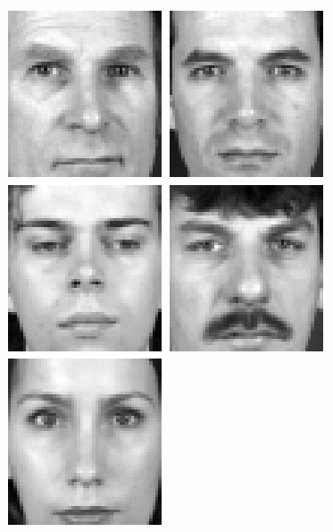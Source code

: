 \begin{figure}
\begin{center}
\includegraphics[scale=0.12]{ch4/figures/XM2VTS_36.png}
\includegraphics[scale=0.12]{ch4/figures/XM2VTS_37.png}
\includegraphics[scale=0.12]{ch4/figures/XM2VTS_38.png}
\includegraphics[scale=0.12]{ch4/figures/XM2VTS_39.png}
\includegraphics[scale=0.12]{ch4/figures/XM2VTS_40.png}\\

\end{center}
\end{figure}
